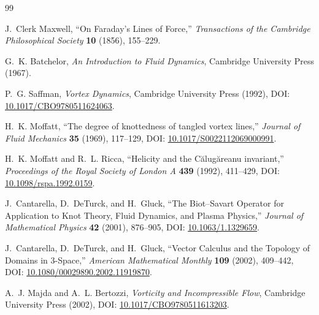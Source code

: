 \begin{thebibliography}{99}

J.~Clerk Maxwell,
\newblock ``On Faraday's Lines of Force,''
\newblock \emph{Transactions of the Cambridge Philosophical Society} \textbf{10} (1856), 155--229.

G.~K. Batchelor,
\newblock \emph{An Introduction to Fluid Dynamics},
\newblock Cambridge University Press (1967).

P.~G. Saffman,
\newblock \emph{Vortex Dynamics},
\newblock Cambridge University Press (1992),
\newblock DOI: \href{https://doi.org/10.1017/CBO9780511624063}{10.1017/CBO9780511624063}.

H.~K. Moffatt,
\newblock ``The degree of knottedness of tangled vortex lines,''
\newblock \emph{Journal of Fluid Mechanics} \textbf{35} (1969), 117--129,
\newblock DOI: \href{https://doi.org/10.1017/S0022112069000991}{10.1017/S0022112069000991}.

H.~K. Moffatt and R.~L. Ricca,
\newblock ``Helicity and the C\u{a}lug\u{a}reanu invariant,''
\newblock \emph{Proceedings of the Royal Society of London A} \textbf{439} (1992), 411--429,
\newblock DOI: \href{https://doi.org/10.1098/rspa.1992.0159}{10.1098/rspa.1992.0159}.

J.~Cantarella, D.~DeTurck, and H.~Gluck,
\newblock ``The Biot--Savart Operator for Application to Knot Theory, Fluid Dynamics, and Plasma Physics,''
\newblock \emph{Journal of Mathematical Physics} \textbf{42} (2001), 876--905,
\newblock DOI: \href{https://doi.org/10.1063/1.1329659}{10.1063/1.1329659}.

J.~Cantarella, D.~DeTurck, and H.~Gluck,
\newblock ``Vector Calculus and the Topology of Domains in 3-Space,''
\newblock \emph{American Mathematical Monthly} \textbf{109} (2002), 409--442,
\newblock DOI: \href{https://doi.org/10.1080/00029890.2002.11919870}{10.1080/00029890.2002.11919870}.

A.~J. Majda and A.~L. Bertozzi,
\newblock \emph{Vorticity and Incompressible Flow},
\newblock Cambridge University Press (2002),
\newblock DOI: \href{https://doi.org/10.1017/CBO9780511613203}{10.1017/CBO9780511613203}.

\end{thebibliography}
